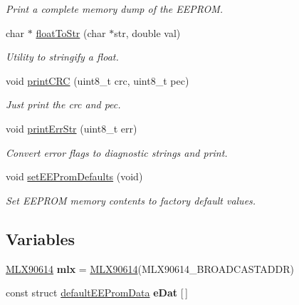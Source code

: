 \begin{DoxyCompactItemize}
\begin{DoxyCompactList}\small\item\em Print a complete memory dump of the E\-E\-P\-R\-O\-M. \end{DoxyCompactList}\item 
char $\ast$ \hyperlink{_melexis_test_8ino_abbd67db9a56c14f56c98c750daf1ab92}{float\-To\-Str} (char $\ast$str, double val)
\begin{DoxyCompactList}\small\item\em Utility to stringify a float. \end{DoxyCompactList}\item 
void \hyperlink{_melexis_test_8ino_a9ca1a07ce803c9b09a05b991f0101107}{print\-C\-R\-C} (uint8\-\_\-t crc, uint8\-\_\-t pec)
\begin{DoxyCompactList}\small\item\em Just print the crc and pec. \end{DoxyCompactList}\item 
void \hyperlink{_melexis_test_8ino_a47075beca8233f9f8e9614f4fb6eabd1}{print\-Err\-Str} (uint8\-\_\-t err)
\begin{DoxyCompactList}\small\item\em Convert error flags to diagnostic strings and print. \end{DoxyCompactList}\item 
void \hyperlink{_melexis_test_8ino_a5662aecfa23cb7ad365b8246e928c843}{set\-E\-E\-Prom\-Defaults} (void)
\begin{DoxyCompactList}\small\item\em Set E\-E\-P\-R\-O\-M memory contents to factory default values. \end{DoxyCompactList}\end{DoxyCompactItemize}
\subsection*{Variables}
\begin{DoxyCompactItemize}
\item 
\hypertarget{_melexis_test_8ino_af12b22cf7e5666147279557c9b55db66}{\hyperlink{class_m_l_x90614}{M\-L\-X90614} {\bfseries mlx} = \hyperlink{class_m_l_x90614}{M\-L\-X90614}(M\-L\-X90614\-\_\-\-B\-R\-O\-A\-D\-C\-A\-S\-T\-A\-D\-D\-R)}\label{_melexis_test_8ino_af12b22cf7e5666147279557c9b55db66}

\item 
const struct \hyperlink{structdefault_e_e_prom_data}{default\-E\-E\-Prom\-Data} {\bfseries e\-Dat} \mbox{[}$\,$\mbox{]}
\end{DoxyCompactItemize}


